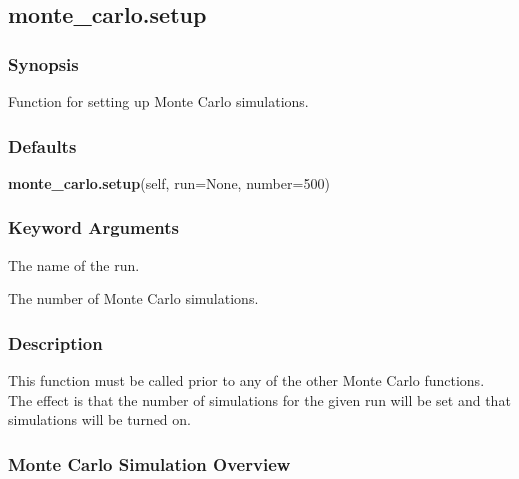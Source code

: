 





\newpage

\subsection{monte\_carlo.setup}


\subsubsection{Synopsis}

Function for setting up Monte Carlo simulations.

\subsubsection{Defaults}

\textsf{\textbf{monte\_carlo.setup}(self, run=None, number=500)}


\subsubsection{Keyword Arguments}


  The name of the run.

  The number of Monte Carlo simulations.

\subsubsection{Description}

This function must be called prior to any of the other Monte Carlo functions.  The effect is
that the number of simulations for the given run will be set and that simulations will be
turned on.



\subsubsection{Monte Carlo Simulation Overview}

